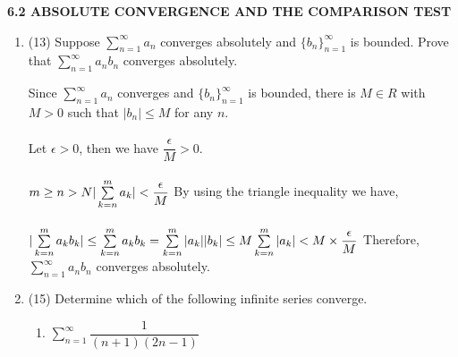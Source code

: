 \documentclass[fleqn]{article}
\begin{document}
  \pagebreak

  \textbf{6.2 ABSOLUTE CONVERGENCE AND THE COMPARISON TEST}
  \begin{enumerate}
    \item (13) Suppose $\sum\limits_{n=1}^{\infty} a_n$ converges absolutely and $\{ b_n \}_{n=1}^{\infty}$ is bounded.
    Prove that $\sum\limits_{n=1}^{\infty} a_n b_n$ converges absolutely.

      \textcolor{hwColor}{
        Since $\sum\limits_{n=1}^{\infty} a_n$ converges and $\{ b_n \}_{n=1}^{\infty}$ is bounded, 
        there is $M \in R$ with $M>0$ such that $|b_n|\leq M$ for any $n$. 
        \\
        \\
        Let $\epsilon >0$, then we have $\dfrac{\epsilon}{M}>0$. 
        \\
        \\
        $
          m \geq n > N
          \\
          \\
          | \sum\limits_{k=n}^{m} a_k | < \dfrac{\epsilon}{M}
        $
        By using the triangle inequality we have,
        \\
        \\
        $
          | \sum\limits_{k=n}^{m} a_k b_k| \leq   \sum\limits_{k=n}^{m} a_k b_k
          =\sum\limits_{k=n}^{m} |a_k| |b_k| \leq M \sum\limits_{k=n}^{m} |a_k| < M \times \dfrac{\epsilon}{M}
          \\
          \\
          \\
        $
        Therefore, $\sum\limits_{n=1}^{\infty} a_n b_n$ converges absolutely. 
        \\
      }

    \item (15) Determine which of the following infinite series converge.
    \begin{enumerate}
      \item $\sum\limits_{n=1}^{\infty} \dfrac{1}{(n+1)(2n-1)}$


\end{enumerate}
\end{enumerate}
\end{document}
